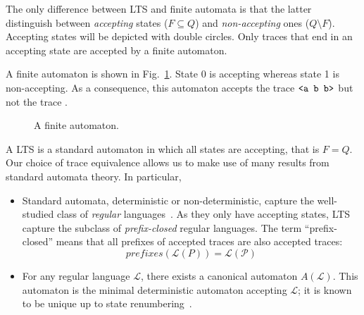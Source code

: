 The only difference between LTS and finite automata is that the latter distinguish between \emph{accepting} states ($F \subseteq Q$) and \emph{non-accepting} ones ($Q \setminus F$). Accepting states will be depicted with double circles. Only traces that end in an accepting state are accepted by a finite automaton.

A finite automaton is shown in Fig.~\ref{image:finite-automaton}. State 0 is accepting whereas state 1 is non-accepting. As a consequence, this automaton accepts the trace $\texttt{<a b b>}$ but not the trace .

\begin{figure}[H]
\centering{}
  \caption{A finite automaton\label{image:finite-automaton}.}
\end{figure}

A LTS is a standard automaton in which all states are accepting, that is $F = Q$. Our choice of trace equivalence allows us to make use of many results from standard automata theory. In particular,
\begin{itemize}
\item Standard automata, deterministic or non-deterministic, capture the well-studied class of \emph{regular} languages~\cite{Hopcroft:1979}. As they only have accepting states, LTS capture the subclass of \emph{prefix-closed} regular languages. The term ``prefix-closed'' means that all prefixes of accepted traces are also accepted traces: 
\begin{equation*}
prefixes(\mathcal{L}(P)) = \mathcal{L(P)}
\end{equation*}
\item For any regular language $\mathcal{L}$, there exists a canonical automaton $A(\mathcal{L})$. This automaton is the minimal deterministic automaton accepting $\mathcal{L}$; it is known to be unique up to state renumbering~\cite{Hopcroft:1979}. 
\end{itemize}


